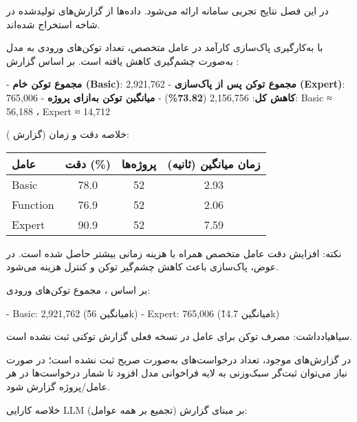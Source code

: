 

در این فصل نتایج تجربی سامانه ارائه می‌شود. داده‌ها از گزارش‌های تولیدشده در شاخه  استخراج شده‌اند.


با به‌کارگیری پاک‌سازی کارآمد  در عامل متخصص، تعداد توکن‌های ورودی به مدل به‌صورت چشم‌گیری کاهش یافته است. بر اساس گزارش :

- \textbf{مجموع توکن خام (Basic)}: 2{,}921{,}762
- \textbf{مجموع توکن پس از پاک‌سازی (Expert)}: 765{,}006
- \textbf{کاهش کل}: 2{,}156{,}756 (\textbf{73.82\%})
- \textbf{میانگین توکن به‌ازای پروژه}: Basic ≈ 56{,}188 ، Expert ≈ 14{,}712


خلاصه دقت و زمان (گزارش ):

\begin{center}
\begin{tabular}{|l|c|c|c|}
\hline
{} عامل &  دقت (\%) &  پروژه‌ها &  زمان میانگین (ثانیه) \\
\hline
Basic & 78.0 & 52 & 2.93 \\
Function & 76.9 & 52 & 2.06 \\
Expert & 90.9 & 52 & 7.59 \\
\hline
\end{tabular}
\end{center}

نکته: افزایش دقت عامل متخصص همراه با هزینه زمانی بیشتر حاصل شده است. در عوض، پاک‌سازی باعث کاهش چشم‌گیر توکن و کنترل هزینه می‌شود.


بر اساس ، مجموع توکن‌های ورودی:

- Basic: 2{,}921{,}762 (میانگین \~56k)
- Expert: 765{,}006 (میانگین \~14.7k)

‌سیاه{یادداشت}: مصرف توکن برای عامل  در نسخه فعلی گزارش توکنی ثبت نشده است.


در گزارش‌های موجود، تعداد درخواست‌های  به‌صورت صریح ثبت نشده است؛ در صورت نیاز می‌توان ثبت‌گر سبک‌وزنی به لایه فراخوانی مدل افزود تا شمار درخواست‌ها در هر عامل/پروژه گزارش شود.


خلاصه کارایی LLM بر مبنای گزارش  (تجمیع بر همه عوامل):

